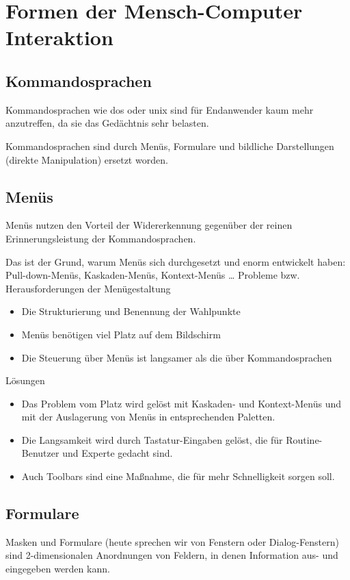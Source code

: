 \section{Formen der Mensch-Computer Interaktion}
\subsection{Kommandosprachen}
Kommandosprachen wie dos oder unix sind für Endanwender kaum mehr anzutreffen, da sie das Gedächtnis sehr belasten. 

Kommandosprachen sind durch Menüs, Formulare und bildliche Darstellungen (direkte Manipulation) ersetzt worden.
\subsection{Menüs}
Menüs nutzen den Vorteil der Widererkennung gegenüber der reinen Erinnerungsleistung der Kommandosprachen. 

Das ist der Grund, warum Menüs sich durchgesetzt und enorm entwickelt haben: Pull-down-Menüs, Kaskaden-Menüs, Kontext-Menüs …
Probleme bzw. Herausforderungen der Menügestaltung
\begin{itemize}
\item Die Strukturierung und Benennung der Wahlpunkte
\item Menüs benötigen viel Platz auf dem Bildschirm 
\item Die Steuerung über Menüs ist langsamer als die über Kommandosprachen
\end{itemize}
Lösungen
\begin{itemize}
\item Das Problem vom Platz wird gelöst mit Kaskaden- und Kontext-Menüs und mit der Auslagerung von Menüs in entsprechenden Paletten.
\item Die Langsamkeit wird durch Tastatur-Eingaben gelöst, die für Routine-Benutzer und Experte gedacht sind.
\item Auch Toolbars sind eine Maßnahme, die für mehr Schnelligkeit sorgen soll.
\end{itemize} 

\subsection{Formulare}
 Masken und Formulare (heute sprechen wir von Fenstern oder Dialog-Fenstern) sind 2-dimensionalen Anordnungen von Feldern, in denen Information aus- und eingegeben werden kann.
 
